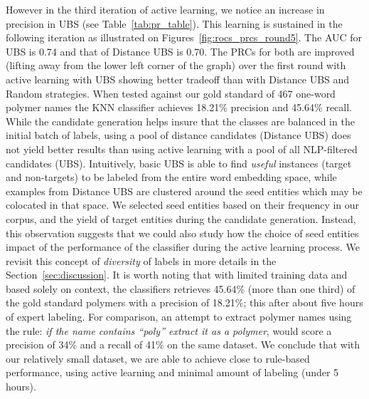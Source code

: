 However in the third iteration of active learning, we notice an increase in precision in UBS (see Table~\ref{tab:pr_table}). 
This learning is sustained in the following iteration as illustrated on Figures~\ref{fig:rocs_prcs_round5}. 
The AUC for UBS is 0.74 and that of Distance UBS is 0.70. 
The PRCs for both are improved (lifting away from the lower left corner of the graph) over the first round with active learning with UBS showing better tradeoff than with Distance UBS and Random strategies.
When tested against our gold standard of 467 one-word polymer names the KNN classifier achieves 18.21\% precision and  45.64\% recall. 
While the candidate generation helps insure that the classes are balanced in the initial batch of labels, using a pool of distance candidates (Distance UBS) does not yield better results than using active learning with a pool of all NLP-filtered candidates (UBS).
Intuitively, basic UBS is able to find \textit{useful} instances (target and non-targets) to be labeled from the entire word embedding space, while examples from Distance UBS are clustered around the seed entities which may be colocated in that space.
We selected seed entities based on their frequency in our corpus, and the yield of target entities during the candidate generation.
Instead, this observation suggests that we could also study how the choice of seed entities impact of the performance of the classifier during the active learning process. 
We revisit this concept of \textit{diversity} of labels in more details in the Section~\ref{sec:discussion}. 
It is worth noting that with limited training data and based solely on context, the classifiers retrieves 45.64\% (more than one third) of the gold standard polymers with a precision of 18.21\%; this after about five hours of expert labeling. 
For comparison, an attempt to extract polymer names using the rule: \textit{if the name contains ``poly'' extract it as a polymer}, would score a precision of 34\% and a recall of 41\% on the same dataset.
We conclude that with our relatively small dataset, we are able to achieve close to rule-based performance, using active learning and minimal amount of labeling (under 5 hours).

